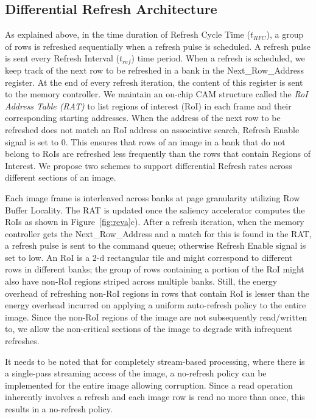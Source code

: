 \subsection{Differential Refresh Architecture}
As explained above, in the time duration of Refresh Cycle Time ($t_{RFC}$), a group of rows is refreshed sequentially when a refresh pulse is scheduled. A refresh pulse is sent every Refresh Interval ($t_{ref}$) time period.  When a refresh is scheduled, we keep track of the next row to be refreshed in a bank in the Next\_Row\_Address register. At the end of every refresh iteration, the content of this register is sent to the memory controller. We maintain an on-chip CAM structure called the \emph{RoI Address Table (RAT)} to list regions of interest (RoI) in each frame and their corresponding starting addresses. When the address of the next row to be refreshed does not match an RoI address on associative search, Refresh Enable signal is set to 0. This ensures that rows of an image in a bank that do not belong to RoIs are refreshed less frequently than the rows that contain Regions of Interest. We propose two schemes to support differential Refresh rates across different sections of an image. 

Each image frame is interleaved across banks at page granularity utilizing Row Buffer Locality. The RAT is updated once the saliency accelerator computes the RoIs as shown in Figure~\ref{fig:reva}c). After a refresh iteration, when the memory controller gets the Next\_Row\_Address and a match for this is found in the RAT, a refresh pulse is sent to the command queue; otherwise Refresh Enable signal is set to low. An RoI is a 2-d rectangular tile and might correspond to different rows in different banks; the group of rows containing a portion of the RoI might also have non-RoI regions striped across multiple banks. Still, the energy overhead of refreshing non-RoI regions in rows that contain RoI is lesser than the energy overhead incurred on applying a uniform auto-refresh policy to the entire image. Since the non-RoI regions of the image are not subsequently read/written to, we allow the non-critical sections of the image to degrade with infrequent refreshes.  

It needs to be noted that for completely stream-based processing, where there is a single-pass streaming access of the image, a no-refresh policy can be implemented for the entire image allowing corruption. Since a read operation inherently involves a refresh and each image row is read no more than once, this results in a no-refresh policy. 

